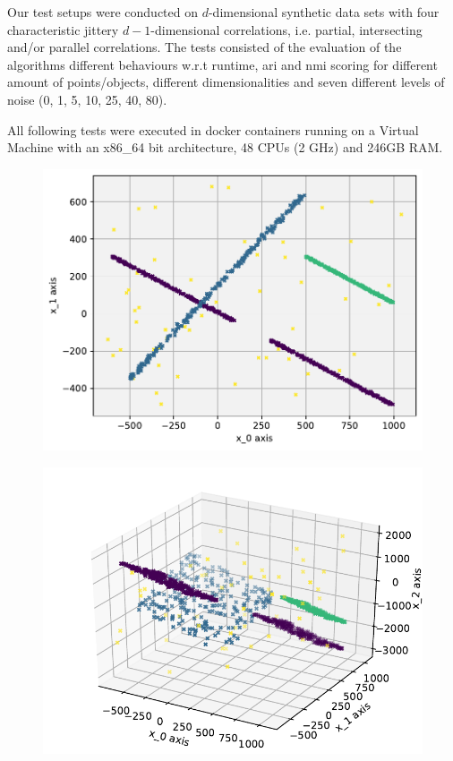 Our test setups were conducted on $d$-dimensional synthetic data sets with four characteristic jittery $d-1$-dimensional correlations, i.e. partial, intersecting and/or parallel correlations. The tests consisted of the evaluation of the algorithms different behaviours w.r.t runtime, \gls{ari} and \gls{nmi} scoring for different amount of points/objects, different dimensionalities and seven different levels of noise (0, 1, 5, 10, 25, 40, 80).

All following tests were executed in docker containers running on a Virtual Machine with an x86\_64 bit architecture, 48 CPUs (2 GHz) and 246GB RAM. 

\begin{figure}
    \centering
    \begin{minipage}[t]{.5\textwidth}
    \centering
    \captionsetup{width=.9\linewidth}
    \includegraphics[width=\textwidth]{evalfigures/2DSetGrid.pdf}
    \label{fig:my_label}
    \end{minipage}%
    \begin{minipage}[t]{.5\textwidth}
    \centering
    \captionsetup{width=.9\linewidth}
    \includegraphics[width=\textwidth]{evalfigures/3DSet.pdf}

\end{minipage}
\end{figure}
